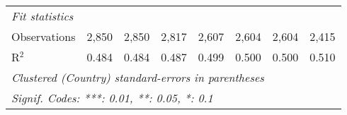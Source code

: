 \begin{tabular}{lccccccc}
   \midrule \emph{Fit statistics}\\
   Observations                                                    & 2,850          & 2,850          & 2,817          & 2,607         & 2,604         & 2,604         & 2,415\\  
   R$^2$                                                           & 0.484          & 0.484          & 0.487          & 0.499         & 0.500         & 0.500         & 0.510\\  
   \midrule
   \multicolumn{8}{l}{\emph{Clustered (Country) standard-errors in parentheses}}\\
   \multicolumn{8}{l}{\emph{Signif. Codes: ***: 0.01, **: 0.05, *: 0.1}}\\
\end{tabular}
\par\endgroup


